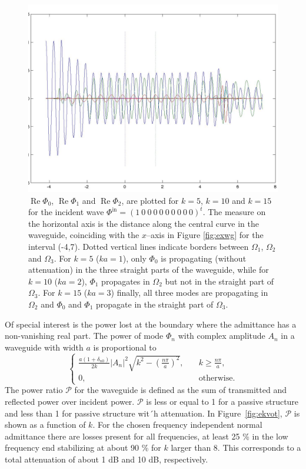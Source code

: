\documentclass[numreferences]{kluwer}
\providecommand{\abs}[1]{\left\lvert#1\right\rvert}
\renewcommand{\Phi}{\varPhi}
\renewcommand{\Re}{\operatorname{Re}}
\renewcommand{\vec}[1]{\bm{#1}}
\renewcommand{\Phi}{\varPhi}
\newcommand{\Phiin}{\vec\Phi^{\text{in}}}
\begin{document}
\begin{figure}[htb]
  \includegraphics[width=\linewidth]{phin3a}
  \caption{$\Re\Phi_0$, $\Re\Phi_1$ and $\Re\Phi_2$, are plotted for
    $k=5$, $k=10$ and $k=15$ for the incident wave $\Phiin=(1\ 0\ 0\
    0\ 0\ 0\ 0\ 0\ 0\ 0)^t$. The measure on the horizontal axis is the
    distance along the central curve in the waveguide, coinciding with
    the $x$--axis in Figure \ref{fig:exwg} for the interval
    (-4,7). Dotted vertical lines indicate borders between $\Omega_1$,
    $\Omega_2$ and $\Omega_3$. For $k=5$ ($ka=1$), only $\Phi_0$ is
    propagating (without attenuation) in the three straight parts of
    the waveguide, while for $k=10$ ($ka=2$), $\Phi_1$ propagates in
    $\Omega_2$ but not in the straight part of $\Omega_3$. For $k=15$
    ($ka=3$) finally, all three modes are propagating in $\Omega_2$
    and $\Phi_0$ and $\Phi_1$ propagate in the straight part of
    $\Omega_3$.}
  \label{fig:phi}
\end{figure}

Of special interest is the power lost at the boundary where the
admittance has a non-vanishing real part. The power of mode $\Phi_n$
with complex amplitude $A_n$ in a waveguide with width $a$ is
proportional to
\begin{equation}\label{eq:power}
  \begin{cases}
    \frac{a(1+\delta_{n0})}{2k}\abs{A_n}^2
    \sqrt{k^2-\left(\frac{n\pi}a\right)^2},\quad&
    k\ge\frac{n\pi}a,\\
    0,&\text{otherwise}.
  \end{cases}
\end{equation}
The power ratio $\mathcal P$ for the waveguide is defined as the sum
of transmitted and reflected power over incident power. $\mathcal P$
is less or equal to 1 for a passive structure and less than 1 for
passive structure wit´h attenuation. In Figure~\ref{fig:ekvot},
$\mathcal P$ is shown as a function of $k$. For the chosen frequency
independent normal admittance there are losses present for all
frequencies, at least 25 \% in the low frequency end stabilizing at
about 90 \% for $k$ larger than 8. This corresponds to a total
attenuation of about 1 dB and 10 dB, respectively.
\end{document}
